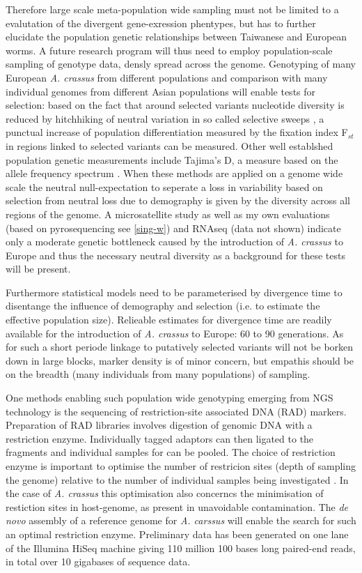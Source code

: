 Therefore large scale meta-population wide sampling must not be
limited to a evalutation of the divergent gene-exression phentypes,
but has to further elucidate the population genetic relationships
between Taiwanese and European worms. A future research program will
thus need to employ population-scale sampling of genotype data, densly
spread across the genome. Genotyping of many European
\textit{A. crassus} from different populations and comparison with
many individual genomes from different Asian populations will enable
tests for selection: based on the fact that around selected variants
nucleotide diversity is reduced by hitchhiking of neutral variation in
so called selective sweeps \cite{pmid16251466}, a punctual increase of
population differentiation measured by the fixation index F$_{st}$
\cite{wright1949genetical} in regions linked to selected variants can
be measured. Other well establshed population genetic measurements
include Tajima's D, a measure based on the allele frequency spectrum
\cite{pmid2513255}. When these methods are applied on a genome wide
scale the neutral null-expectation to seperate a loss in variability
based on selection from neutral loss due to demography is given by the
diversity across all regions of the genome. A microsatellite study
\cite{wielgoss_population_2008} as well as my own evaluations (based
on pyrosequencing see \ref{sing-w}) and RNAseq (data not shown)
indicate only a moderate genetic bottleneck caused by the introduction
of \textit{A. crassus} to Europe and thus the necessary neutral
diversity as a background for these tests will be present.

Furthermore statistical models need to be parameterised by divergence
time to disentange the influence of demography and selection (i.e. to
estimate the effective population size). Relieable estimates for
divergence time are readily available for the introduction of
\textit{A. crassus} to Europe: 60 to 90 generations. As for such a
short periode linkage to putatively selected variants will not be
borken down in large blocks, marker density is of minor concern, but
empathis should be on the breadth (many individuals from many
populations) of sampling.

One methods enabling such population wide genotyping emerging from NGS
technology is the sequencing of restriction-site associated DNA (RAD)
markers. Preparation of RAD libraries involves digestion of genomic
DNA with a restriction enzyme. Individually tagged adaptors can then
ligated to the fragments and individual samples for can be pooled. The
choice of restriction enzyme is important to optimise the number of
restricion sites (depth of sampling the genome) relative to the number
of individual samples being investigated \cite{pmid18852878}. In the
case of \textit{A. crassus} this optimisation also concerncs the
minimisation of restiction sites in host-genome, as present in
unavoidable contamination. The \textit{de novo} assembly of a
reference genome for \textit{A. carssus} will enable the search for
such an optimal restriction enzyme. Preliminary data has been
generated on one lane of the Illumina HiSeq machine giving 110 million
100 bases long paired-end reads, in total over 10 gigabases of
sequence data.

